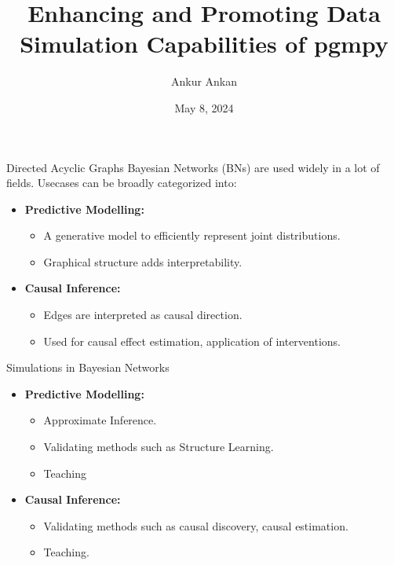 \documentclass{beamer}
\title[]{Enhancing and Promoting Data Simulation Capabilities of pgmpy}
\author{Ankur Ankan}
\date{May 8, 2024}
\begin{document}
\maketitle

\begin{frame}{Directed Acyclic Graphs}
Bayesian Networks (BNs) are used widely in a lot of fields. Usecases can be broadly categorized into: 
\begin{itemize}
	\item \textbf{Predictive Modelling:}
		\begin{itemize}
			\item A generative model to efficiently represent joint distributions.
			\item Graphical structure adds interpretability.
		\end{itemize}
	\item \textbf{Causal Inference:}
		\begin{itemize}
			\item Edges are interpreted as causal direction.
			\item Used for causal effect estimation, application of interventions.
		\end{itemize}
\end{itemize}

\end{frame}

\begin{frame}{Simulations in Bayesian Networks}
	\begin{itemize}
		\item \textbf{Predictive Modelling:}
			\begin{itemize}
				\item Approximate Inference.
				\item Validating methods such as Structure Learning.
				\item Teaching
			\end{itemize}
		\item \textbf{Causal Inference:}
			\begin{itemize}
				\item Validating methods such as causal discovery, causal estimation.
				\item Teaching.
			\end{itemize}
	\end{itemize}
\end{frame}
\end{document}
